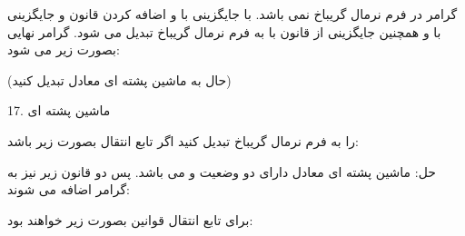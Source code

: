 \documentclass[]{article}
\begin{document}
گرامر در فرم نرمال گریباخ نمی باشد. با جایگزینی  با  و اضافه کردن قانون  و جایگزینی  با  و همچنین جایگزینی  از قانون  با  به فرم نرمال گریباخ تبدیل می شود. گرامر نهایی بصورت زیر می شود:

\begin{center}
\end{center}
\begin{center}
\end{center}
\begin{center}
\end{center}
\begin{center}
\end{center}
\begin{center}
\end{center}
\begin{center}
\end{center}
(حال به ماشین پشته ای معادل تبدیل کنید)

17. ماشین پشته ای

\begin{center}
\end{center}

را به فرم نرمال گریباخ تبدیل کنید اگر تابع انتقال بصورت زیر باشد:

\begin{center}
\end{center}

حل: ماشین پشته ای معادل دارای دو وضعیت  و  می باشد. پس دو قانون زیر نیز به گرامر اضافه می شوند:
\begin{center}
\end{center}

برای تابع انتقال
قوانین بصورت زیر خواهند بود:
\begin{center}
\end{center}
\begin{center}
\end{center}
\begin{center}
\end{center}
\begin{center}
\end{center}
\begin{center}
\end{center}
\end{document}

